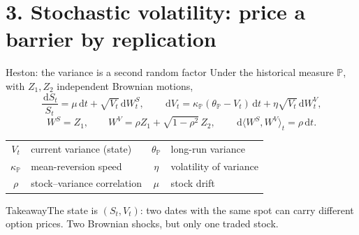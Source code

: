 \documentclass[handout,10pt,t,aspectratio=169]{beamer}
\newenvironment{keybox}{\begin{exampleblock}{Takeaway}}{\end{exampleblock}}
\newcommand{\Pp}{\mathbb P}
\newcommand{\dd}{\,\mathrm d}
\begin{document}
\section{3. Stochastic volatility: price a barrier by replication}

\begin{frame}{Heston: the variance is a second random factor}
\small
Under the historical measure \(\Pp\), with \(Z_1,Z_2\) independent Brownian motions,
\[
\frac{\dd S_t}{S_t}=\mu\dd t+\sqrt{V_t}\dd W_t^S,\qquad
\dd V_t=\kappa_\Pp(\theta_\Pp-V_t)\dd t+\eta\sqrt{V_t}\dd W_t^V,
\]
\[
W^S=Z_1,\qquad W^V=\rho Z_1+\sqrt{1-\rho^2}\,Z_2,\qquad \dd\langle W^S,W^V\rangle_t=\rho\dd t.
\]
\begin{center}\begin{tabular}{clcl}
\toprule \(V_t\)&current variance (state)&\(\theta_\Pp\)&long-run variance\\
\(\kappa_\Pp\)&mean-reversion speed&\(\eta\)&volatility of variance\\
\(\rho\)&stock--variance correlation&\(\mu\)&stock drift\\\bottomrule
\end{tabular}\end{center}
\begin{keybox}The state is \((S_t,V_t)\): two dates with the same spot can carry different
option prices. Two Brownian shocks, but only one traded stock.\end{keybox}
\end{frame}
\end{document}
